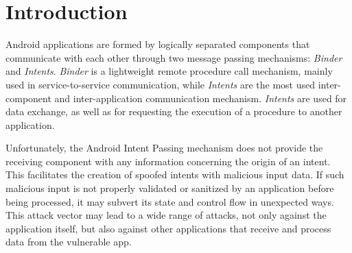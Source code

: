 \section{Introduction}


Android applications are formed by logically separated
components that communicate with each other through two message passing mechanisms:
\emph{Binder} and \emph{Intents}. \emph{Binder} is a lightweight remote procedure call
mechanism, mainly used in service-to-service communication, while
\emph{Intents} are the most used inter-component and inter-application communication mechanism.
\emph{Intents} are used for data exchange, as well as for requesting the
execution of a procedure to another application.

Unfortunately, the Android Intent Passing mechanism does not provide the
receiving component with any information concerning the origin of an intent.
This facilitates the creation of spoofed intents with malicious input data. If such
malicious input is not properly validated or sanitized by an application
before being processed, it may subvert its state and control flow in unexpected
ways. This attack vector may lead to a wide range of attacks, not only against
the application itself, but also against other applications that receive and
process data from the vulnerable app. %


